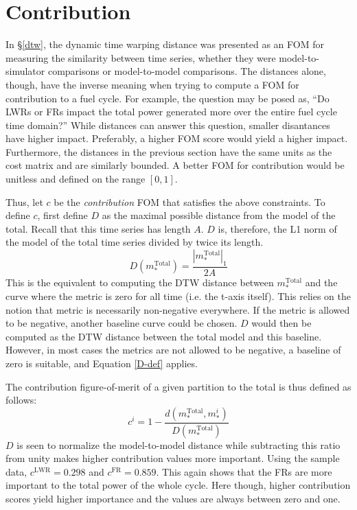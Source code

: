 \documentclass{ntmanuscript}
\newcommand{\LWR}{\mathrm{LWR}}
\newcommand{\FR}{\mathrm{FR}}
\newcommand{\Total}{\mathrm{Total}}
\begin{document}
\clearpage
\section{Contribution}
\label{contribution}

In \S\ref{dtw}, the dynamic time warping distance was presented as an
FOM for measuring the similarity between time series, whether they
were model-to-simulator comparisons or model-to-model comparisons.
The distances alone, though, have the inverse meaning when trying to
compute a FOM for contribution to a fuel cycle.  For example, the
question may be posed as, ``Do LWRs or FRs impact the total power generated
more over the entire fuel cycle time domain?''
While distances can answer this question, smaller
disantances have higher impact. Preferably, a higher FOM score would yield a
higher impact. Furthermore, the distances in the previous section have
the same units as the cost matrix and are similarly bounded. A better
FOM for contribution would be unitless and defined on the range $[0,1]$.

Thus, let $c$ be the \emph{contribution} FOM that satisfies the above
constraints. To define $c$, first define $D$ as the maximal possible
distance from the model of the total. Recall that this time series has length $A$.
$D$ is, therefore, the L1 norm of the model of the total time series divided
by twice its length.
\begin{equation}
\label{D-def}
D(m_*^\Total) = \frac{\left|m_*^\Total\right|_1}{2A}
\end{equation}
This is the equivalent to computing the DTW distance
between $m_*^\Total$ and the curve where the metric is zero for all time
(i.e. the t-axis itself).  This relies on the notion that
metric is necessarily non-negative everywhere.  If the metric is allowed to
be negative, another baseline curve could be chosen. $D$ would then be
computed as the DTW distance between the total model and this baseline.
However, in most cases the metrics are not allowed to be negative,
a baseline of zero is suitable, and Equation \ref{D-def} applies.

The contribution figure-of-merit of a given partition to the total is thus
defined as follows:
\begin{equation}
\label{cont}
c^i = 1 - \frac{d(m_*^\Total, m_*^i)}{D(m_*^\Total)}
\end{equation}
$D$ is seen to normalize the model-to-model distance while subtracting this
ratio from unity makes higher contribution values more important.
Using the sample data, $c^\LWR = 0.298$ and $c^\FR = 0.859$. This again shows
that the FRs are more important to the total power of the whole cycle.
Here though, higher contribution scores yield higher importance and the values
are always between zero and one.
\end{document}

